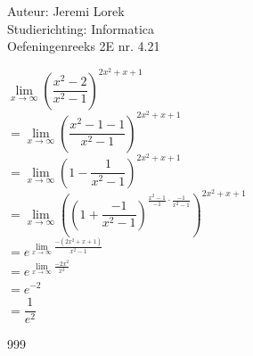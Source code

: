 \documentclass[a4paper]{article}
\begin{document}
  
\noindent \large Auteur: Jeremi Lorek\\
\noindent \large Studierichting: Informatica\\
\noindent \large Oefeningenreeks 2E nr. 4.21\\

\medskip
\normalsize

$\lim\limits_{x \to \infty} \left( \dfrac{x^2 - 2}{x^2 - 1} \right)^{2x^2 + x + 1}$  \\

$= \lim\limits_{x \to \infty} \left( \dfrac{x^2 - 1 - 1}{x^2 - 1} \right)^{2x^2 + x + 1}$  \\

$= \lim\limits_{x \to \infty} \left( 1 - \dfrac{1}{x^2 - 1} \right)^{2x^2 + x + 1}$  \\

$= \lim\limits_{x \to \infty} \left( \left( 1 + \dfrac{-1}{x^2 - 1} \right)^{\tfrac{x^2 - 1}{-1} \cdot \tfrac{-1}{x^2 - 1}} \right)^{2x^2 + x + 1}$  \\

$= e^{\lim\limits_{x \to \infty} \tfrac{-(2x^2 + x + 1)}{x^2 - 1}}$  \\

$= e^{\lim\limits_{x \to \infty} \tfrac{-2x^2}{x^2}} $ \\

$= e^{-2} $ \\

$= \dfrac{1}{e^2}$  \\


\begin{thebibliography}{999}
\end{thebibliography}
\end{document}
